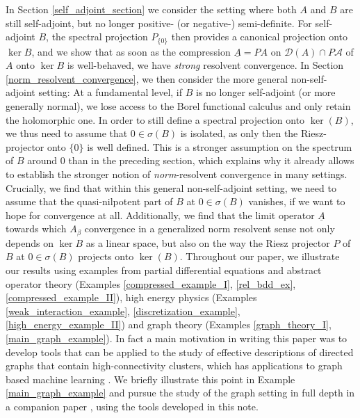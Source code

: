 \documentclass[reqno,12pt,letterpaper]{amsart}
\numberwithin{equation}{section}
\newcommand{\1}{\mathds{1}}
\theoremstyle{definition}
\begin{document}
In Section \ref{self_adjoint_section} we consider the setting where both $A$ and $B$ are still self-adjoint, but no longer positive- (or negative-) semi-definite. For self-adjoint $B$, the spectral projection $P_{\{0\}}$ then provides a canonical projection onto $\ker{B}$, and we show that as soon as the compression  $\underline{A} = PA$ on $\mathcal{D}(A) \cap P \mathcal{A}$ of $A$ onto $\ker{B}$  is well-behaved, we have \emph{strong} resolvent convergence.
In Section \ref{norm_resolvent_convergence}, we then consider the more general non-self-adjoint setting: At a fundamental level, if $B$ is no longer self-adjoint (or more generally normal), we lose access to the Borel functional calculus and only retain the holomorphic one. In order to still define a spectral projection onto $\ker(B)$, we thus need to assume that $0 \in \sigma(B)$ is isolated, as only then the Riesz-projector onto $\{0\}$ is well defined. This is a stronger assumption on the spectrum of $B$ around $0$ than in the preceding section, which explains why it 
already allows to establish the stronger notion of \emph{norm}-resolvent convergence in many settings. Crucially, we find that within this general non-self-adjoint setting, we need to assume that the quasi-nilpotent part of $B$ at $0 \in \sigma(B)$ vanishes, if we want to hope for convergence at all. Additionally, we find that the limit operator $\underline{A}$ towards which $A_\beta$ convergence in a generalized norm resolvent sense not only depends on $\ker{B}$ as a linear space, but also on the way the Riesz projector $P$ of $B$ at $0 \in \sigma(B)$ projects onto $\ker(B)$.
\medskip
 Throughout our paper, we illustrate our results using examples from partial differential equations and abstract operator theory (Examples  \ref{compressed_example_I}, \ref{rel_bdd_ex}, \ref{compressed_example_II}), high energy physics (Examples \ref{weak_interaction_example}, \ref{discretization_example}, \ref{high_energy_example_II})
and 
graph theory (Examples \ref{graph_theory_I}, \ref{main_graph_example}). In fact a main motivation in writing this paper was to develop tools that can be applied to the study of effective descriptions of directed graphs that contain high-connectivity clusters, which has applications to graph based machine learning \cite{koke2024holonets}. We briefly illustrate this point in Example \ref{main_graph_example} and pursue the study of the graph setting in full depth in a companion paper \cite{koke_graph26}, using the tools developed in this note.
\end{document}
